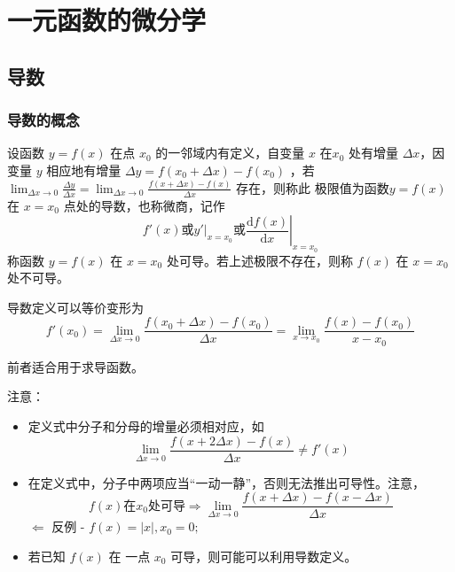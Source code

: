 \chapter{一元函数的微分学}

\section{导数}

\subsection{导数的概念}

\begin{Def}[导数]

    设函数 $ y=f(x) $ 在点 $ x_{0} $ 的一邻域内有定义，自变量 $ x $ 在$ x_0 $ 处有增量 $ \Delta x $，因变量 $ y $ 
    相应地有增量 $ \Delta y=f(x_0+\Delta x)-f(x_0) $ ，若 
    $ {\displaystyle\lim_{\Delta x\rightarrow 0}}\frac{\Delta y}{\Delta x}=
    {\displaystyle\lim_{\Delta x\rightarrow 0}}\frac{f(x+\Delta x)-f(x)}{\Delta x} $ 存在，则称此
    极限值为函数$ y=f(x) $ 在 $ x=x_0 $ 点处的导数，也称微商，记作$$
        f'(x)\textrm{或}\left.y'\right|_{x=x_0}\textrm{或}\left.\frac{\mathrm{d}f(x)}{\mathrm{d}x}\right|_{x=x_0}
    $$ 
    称函数 $ y=f(x) $ 在 $ x=x_0 $ 处可导。若上述极限不存在，则称 $ f(x) $ 在 $ x=x_0 $ 处不可导。 
\end{Def}

\begin{Field}[导数定义的等价变形]

    导数定义可以等价变形为
    $$
        f'(x_0)={\displaystyle\lim_{\Delta x\rightarrow 0}}\frac{f(x_0+\Delta x)-f(x_0)}{\Delta x}=
        {\displaystyle\lim_{x\rightarrow x_0}} \frac{f(x)-f(x_0)}{x-x_0}
    $$ 
\end{Field}
前者适合用于求导函数。

注意：
\begin{itemize}
    \item 定义式中分子和分母的增量必须相对应，如$$
        {\displaystyle\lim_{\Delta x\rightarrow 0}\frac{f(x+2\Delta x)-f(x)}{\Delta x}}\neq f'(x)
    $$ 
    \item 在定义式中，分子中两项应当“一动一静”，否则无法推出可导性。注意，$$
        f(x)\textrm{在}x_0\textrm{处可导}\Rightarrow 
        {\displaystyle\lim_{\Delta x\rightarrow 0}}\frac{f(x+\Delta x)-f(x-\Delta x)}{\Delta x}
    $$ 
    $ \Leftarrow $ 反例 - $ f(x)=|x|, x_0 = 0; $ 
    \item 若已知 $ f(x) $ 在 一点 $ x_0 $ 可导，则可能可以利用导数定义。
\end{itemize}

